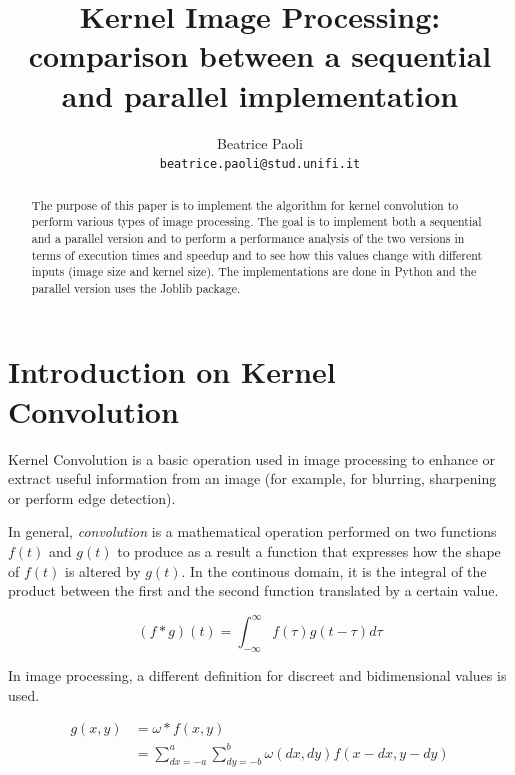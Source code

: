 \documentclass[10pt,twocolumn,letterpaper]{article}
\begin{document}
\title{Kernel Image Processing: comparison between a sequential and parallel implementation}

\author{Beatrice Paoli\\
{\tt\small beatrice.paoli@stud.unifi.it}
}

\maketitle
\thispagestyle{empty}

\begin{abstract}
	The purpose of this paper is to implement the algorithm for kernel convolution to perform various types of image processing. The goal is to implement both a sequential and a parallel version and to perform a performance analysis of the two versions in terms of execution times and speedup and to see how this values change with different inputs (image size and kernel size). The implementations are done in Python and the parallel version uses the Joblib package.
\end{abstract}


\section{Introduction on Kernel Convolution}

Kernel Convolution is a basic operation used in image processing to enhance or extract useful information from an image (for example, for blurring, sharpening or perform edge detection).

In general, \textit{convolution} is a mathematical operation performed on two functions $f(t)$ and $g(t)$ to produce as a result a function that expresses how the shape of $f(t)$ is altered by $g(t)$. In the continous domain, it is the integral of the product between the first and the second function translated by a certain value.

\[(f*g)(t) = \int_{-\infty}^{\infty}f(\tau)g(t - \tau)d\tau\]

In image processing, a different definition for discreet and bidimensional values is used.

\begin{equation*}\begin{split} g(x, y) & = \omega * f(x, y) \\ & = \sum_{dx = -a}^{a}\sum_{dy = -b}^{b}\omega(dx, dy)f(x - dx, y - dy)\end{split}\end{equation*}
\end{document}
